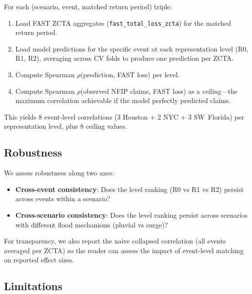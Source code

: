 For each (scenario, event, matched return period) triple:
\begin{enumerate}
  \item Load FAST ZCTA aggregates (\texttt{fast\_total\_loss\_zcta})
        for the matched return period.
  \item Load model predictions for the specific event at each
        representation level (R0, R1, R2), averaging across CV folds
        to produce one prediction per ZCTA.
  \item Compute Spearman $\rho$(prediction, FAST loss) per level.
  \item Compute Spearman $\rho$(observed NFIP claims, FAST loss) as
        a ceiling---the maximum correlation achievable if the model
        perfectly predicted claims.
\end{enumerate}

\noindent
This yields 8 event-level correlations (3 Houston + 2 NYC + 3 SW~Florida)
per representation level, plus 8 ceiling values.

\subsection{Robustness}
\label{app:fast-robustness}

We assess robustness along two axes:
\begin{itemize}
  \item \textbf{Cross-event consistency}: Does the level ranking
        (R0 vs R1 vs R2) persist across events within a scenario?
  \item \textbf{Cross-scenario consistency}: Does the level ranking
        persist across scenarios with different flood mechanisms
        (pluvial vs surge)?
\end{itemize}

\noindent
For transparency, we also report the naive collapsed correlation
(all events averaged per ZCTA) so the reader can assess the impact
of event-level matching on reported effect sizes.

\subsection{Limitations}
\label{app:fast-limitations}

